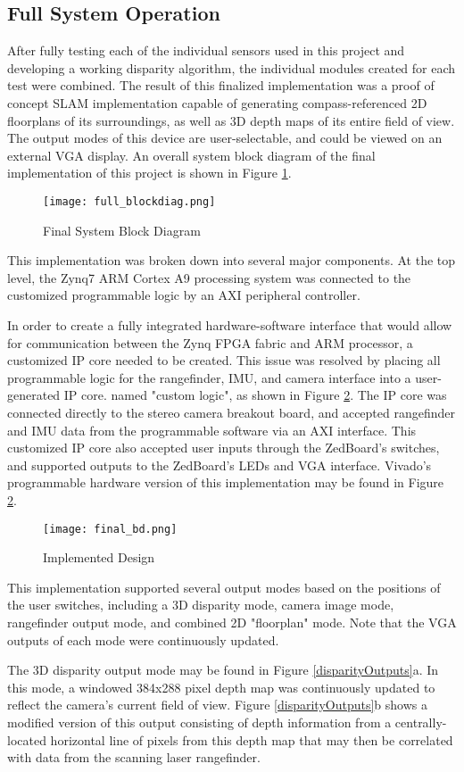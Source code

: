 \subsection{Full System Operation}
After fully testing each of the individual sensors used in this project and developing a working disparity algorithm, the individual modules created for each test were combined. The result of this finalized implementation was a proof of concept SLAM implementation capable of generating compass-referenced 2D floorplans of its surroundings, as well as 3D depth maps of its entire field of view. The output modes of this device are user-selectable, and could be viewed on an external VGA display. An overall system block diagram of the final implementation of this project is shown in Figure \ref{systemBD2}.

\begin{figure}[H] 
	\centerline{
	\texttt{[image: full\_blockdiag.png]}
	}
	\caption{Final System Block Diagram}
	\label{systemBD2}
\end{figure}

This implementation was broken down into several major components. At the top level, the Zynq7 ARM Cortex A9 processing system was connected to the customized programmable logic by an AXI peripheral controller.
\par
In order to create a fully integrated hardware-software interface that would allow for communication between the Zynq FPGA fabric and ARM processor, a customized IP core needed to be created. This issue was resolved by placing all programmable logic for the rangefinder, IMU, and camera interface into a user-generated IP core. named "custom logic", as shown in Figure \ref{finalBD}. The IP core was connected directly to the stereo camera breakout board, and accepted rangefinder and IMU data from the programmable software via an AXI interface. This customized IP core also accepted user inputs through the ZedBoard's switches, and supported outputs to the ZedBoard's LEDs and VGA interface. Vivado's programmable hardware version of this implementation may be found in Figure \ref{finalBD}.

\begin{figure}[H] 
	\centerline{
	\texttt{[image: final\_bd.png]}
	}
	\caption{Implemented Design}
	\label{finalBD}
\end{figure}

This implementation supported several output modes based on the positions of the user switches, including a 3D disparity mode, camera image mode, rangefinder output mode, and combined 2D "floorplan" mode. Note that the VGA outputs of each mode were continuously updated.
\par
The 3D disparity output mode may be found in Figure \ref{disparityOutputs}a. In this mode, a windowed 384x288 pixel depth map was continuously updated to reflect the camera's current field of view. Figure \ref{disparityOutputs}b shows a modified version of this output consisting of depth information from a centrally-located horizontal line of pixels from this depth map that may then be correlated with data from the scanning laser rangefinder. 

